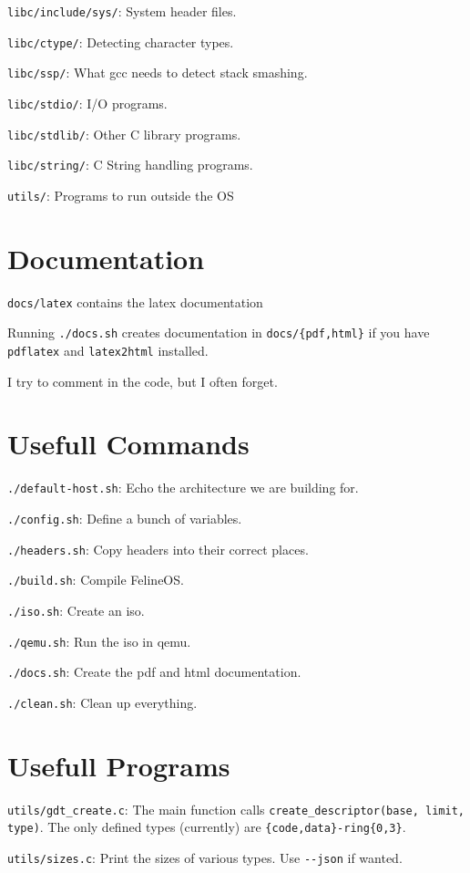 \documentclass[12pt]{article}
\newcommand{\code}[1]{\colorbox{light-gray}{\texttt{#1}}}
\begin{document}
\begin{list}{}{}
\item \code{libc/include/sys/}: System header files.
\item \code{libc/ctype/}: Detecting character types.
\item \code{libc/ssp/}: What gcc needs to detect stack smashing.
\item \code{libc/stdio/}: I/O programs.
\item \code{libc/stdlib/}: Other C library programs.
\item \code{libc/string/}: C String handling programs.
\item \code{utils/}: Programs to run outside the OS
\end{list}

\section{Documentation}
\begin{list}{}{}
\item \code{docs/latex} contains the latex documentation
\item Running \code{./docs.sh} creates documentation in \code{docs/\{pdf,html\}} if you have \code{pdflatex} and \code{latex2html} installed.
\item I try to comment in the code, but I often forget.
\end{list}

\section{Usefull Commands}
\begin{list}{}{}
\item \code{./default-host.sh}: Echo the architecture we are building for.
\item \code{./config.sh}: Define a bunch of variables.
\item \code{./headers.sh}: Copy headers into their correct places.
\item \code{./build.sh}: Compile FelineOS.\@
\item \code{./iso.sh}: Create an iso.
\item \code{./qemu.sh}: Run the iso in qemu.
\item \code{./docs.sh}: Create the pdf and html documentation.
\item \code{./clean.sh}: Clean up everything.
\end{list}

\section{Usefull Programs}
\begin{list}{}{}
\item \code{utils/gdt\_create.c}: The main function calls \code{create\_descriptor(base, limit, type)}. The only defined types (currently) are \code{\{code,data\}-ring\{0,3\}}.
\item \code{utils/sizes.c}: Print the sizes of various types. Use \code{-{}-json} if wanted.
\end{list}
\end{document}

